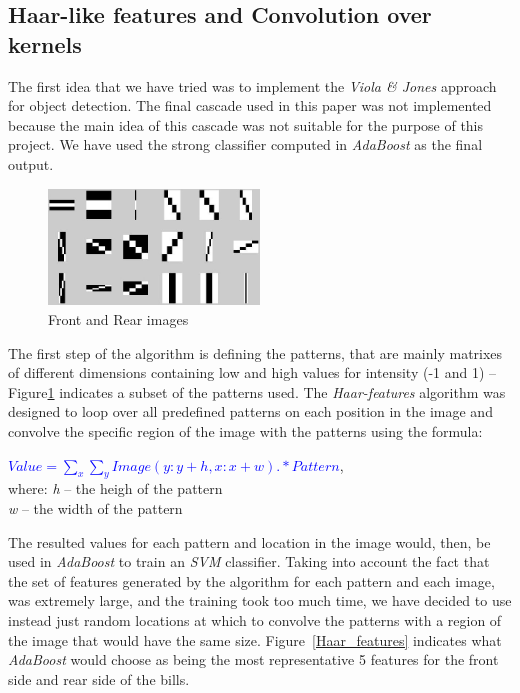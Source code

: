 \documentclass[11pt,twocolumn]{article}
\begin{document}
	\subsection{Haar-like features and Convolution over kernels}\label{sec:Haar}
	\hspace*{10px}The first idea that we have tried was to implement the \emph{Viola \& Jones} approach for object detection. The final cascade used in this paper was not implemented because the main idea of this cascade was not suitable for the purpose of this project. We have used the strong classifier computed in \emph{AdaBoost} as the final output.\\
\begin{figure}[!hbtp]
\centering
\includegraphics[width=0.5\textwidth]{img/patterns.jpg}
\caption{Front and Rear images}
\label{patterns}
\end{figure}
	\hspace*{10px}The first step of the algorithm is defining the patterns, that are mainly matrixes of different dimensions containing low and high values for intensity (-1 and 1) -- Figure\ref{patterns} indicates a subset of the patterns used. The \emph{Haar-features} algorithm was designed to loop over all predefined patterns on each position in the image and convolve the specific region of the image with the patterns using the formula:
\begin{flushleft}
\selectfont\small
\textcolor{blue}{\emph{$Value = \sum_x\sum_y Image(y:y+h,x:x+w) .* Pattern$}},\\[5pt]
where: \emph{h} -- the heigh of the pattern\\
\hspace*{28px} \emph{w} -- the width of the pattern 
\end{flushleft}
The resulted values for each pattern and location in the image would, then, be used in \emph{AdaBoost} to train an \emph{SVM} classifier. Taking into account the fact that the set of features generated by the algorithm for each pattern and each image, was extremely large, and the training took too much time, we have decided to use instead just random locations at which to convolve the patterns with a region of the image that would have the same size. Figure~\ref{Haar_features} indicates what \emph{AdaBoost} would choose as being the most representative 5 features for the front side and rear side of the bills.\\
\end{document}
